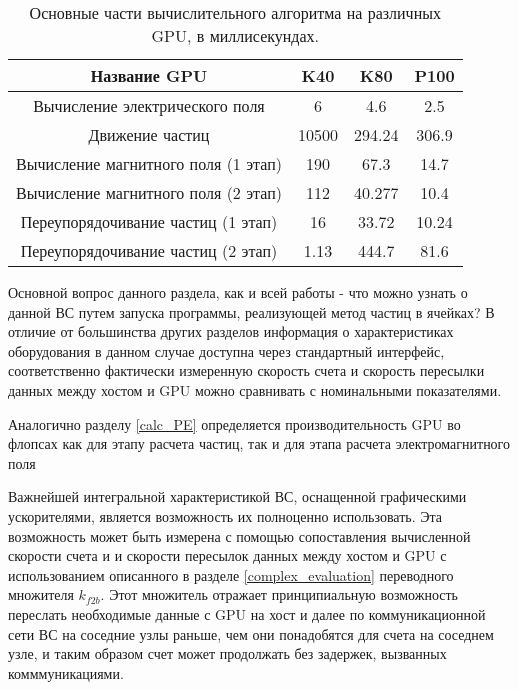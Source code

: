 \begin{table}[ht]
	\caption{ Основные части вычислительного алгоритма на различных GPU, в миллисекундах.}
	\begin{center}
		\begin{tabular}{|c|c|c|c|}
			\hline
			Название GPU & K40 & K80 & P100\\\hline
			Вычисление электрического поля      & 6    & 4.6     & 2.5    \\\hline
			Движение частиц                     &10500 & 294.24  & 306.9  \\\hline
			Вычисление магнитного поля (1 этап) & 190  & 67.3    & 14.7   \\\hline
			Вычисление магнитного поля (2 этап) & 112  & 40.277  & 10.4   \\ \hline
			Переупорядочивание частиц (1 этап)  & 16   & 33.72   & 10.24  \\ \hline
			Переупорядочивание частиц (2 этап)  & 1.13 & 444.7   & 81.6       \\ \hline
		\end{tabular}
	\end{center}
	\label{tabP100}
\end{table}


Основной вопрос данного раздела, как и всей работы - что можно узнать о данной ВС путем запуска программы, реализующей метод частиц в ячейках? В отличие от 	большинства других разделов информация о характеристиках оборудования в данном случае доступна через стандартный интерфейс, соответственно фактически измеренную скорость счета и скорость пересылки данных между хостом и GPU можно сравнивать с номинальными показателями.

Аналогично разделу \ref{calc_PE} определяется производительность GPU во флопсах как для этапу расчета частиц, так и для этапа расчета электромагнитного поля

Важнейшей интегральной характеристикой ВС, оснащенной графическими ускорителями, является возможность их полноценно использовать. Эта возможность
может быть измерена с помощью сопоставления вычисленной скорости счета и и скорости пересылок данных между хостом и GPU с использованием описанного 
в разделе \ref{complex_evaluation} переводного множителя $k_{f2b}$. Этот множитель отражает принципиальную возможность переслать необходимые данные с GPU на хост и далее по коммуникационной сети ВС на соседние узлы раньше, чем они понадобятся для счета на соседнем узле, и таким образом счет может продолжать без задержек, вызванных комммуникациями.

